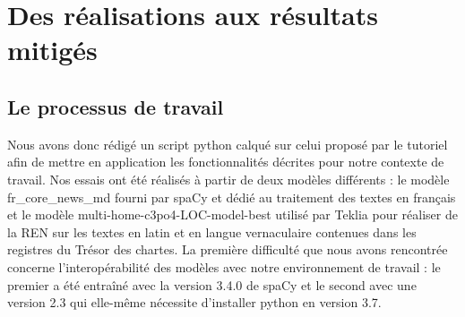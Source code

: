 \documentclass[a4paper,12pt,twoside]{book}
\begin{document}
	
	\section{Des réalisations aux résultats mitigés}
	
	\subsection{Le processus de travail}
	
	Nous avons donc rédigé un script python calqué sur celui proposé par le tutoriel afin de mettre en application les fonctionnalités décrites pour notre contexte de travail. Nos essais ont été réalisés à partir de deux modèles différents : le modèle \og fr\_core\_news\_md\fg{} fourni par spaCy et dédié au traitement des textes en français et le modèle \og multi-home-c3po4-LOC-model-best\fg{} utilisé par Teklia pour réaliser de la REN sur les textes en latin et en langue vernaculaire contenues dans les registres du Trésor des chartes. La première difficulté que nous avons rencontrée concerne l'interopérabilité des modèles avec notre environnement de travail : le premier a été entraîné avec la version 3.4.0 de spaCy et le second avec une version 2.3 qui elle-même nécessite d'installer python en version 3.7.
	
\end{document}
